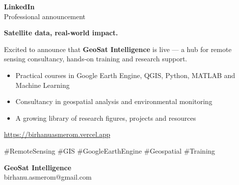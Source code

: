 \documentclass[a5paper,11pt]{article}
\begin{document}
\noindent{}

\begin{center}
  \vspace*{-0.35cm}
  {\Huge\bfseries\color{white} LinkedIn}\\[1mm]
  {\small\color{white} Professional announcement}
\end{center}

\vspace{0.65cm}

\noindent\hspace{1.15cm}\begin{minipage}{\dimexpr\paperwidth-2.3cm\relax}

{\Large\bfseries\color{branddark} Satellite data, real-world impact.}\par\vspace{3mm}

Excited to announce that \textbf{GeoSat Intelligence} is live --- a hub for
remote sensing consultancy, hands-on training and research support.\par\vspace{2mm}

\begin{itemize}[leftmargin=5mm,itemsep=1.5mm,topsep=0pt,label=\textcolor{accent}{\textbullet}]
  \item Practical courses in Google Earth Engine, QGIS, Python, MATLAB and Machine Learning
  \item Consultancy in geospatial analysis and environmental monitoring
  \item A growing library of research figures, projects and resources
\end{itemize}
\vspace{2mm}

{\color{accent}\url{https://birhanuasmerom.vercel.app}}\par\vspace{3mm}

{\small\color{brandmuted} \#RemoteSensing \quad \#GIS \quad \#GoogleEarthEngine \quad \#Geospatial \quad \#Training}
\end{minipage}

\vfill

\begin{center}
  {\bfseries\color{branddark} GeoSat Intelligence}\\[1mm]
  {\small\color{brandmuted} birhanu.asmerom@gmail.com}
\end{center}
\vspace{0.85cm}
\end{document}
